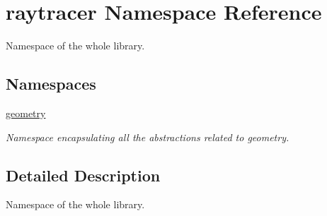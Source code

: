 \hypertarget{namespaceraytracer}{}\section{raytracer Namespace Reference}
\label{namespaceraytracer}


Namespace of the whole library.  


\subsection*{Namespaces}
\begin{DoxyCompactItemize}
\item 
 \hyperlink{namespaceraytracer_1_1geometry}{geometry}
\begin{DoxyCompactList}\small\item\em Namespace encapsulating all the abstractions related to geometry. \end{DoxyCompactList}\end{DoxyCompactItemize}


\subsection{Detailed Description}
Namespace of the whole library. 